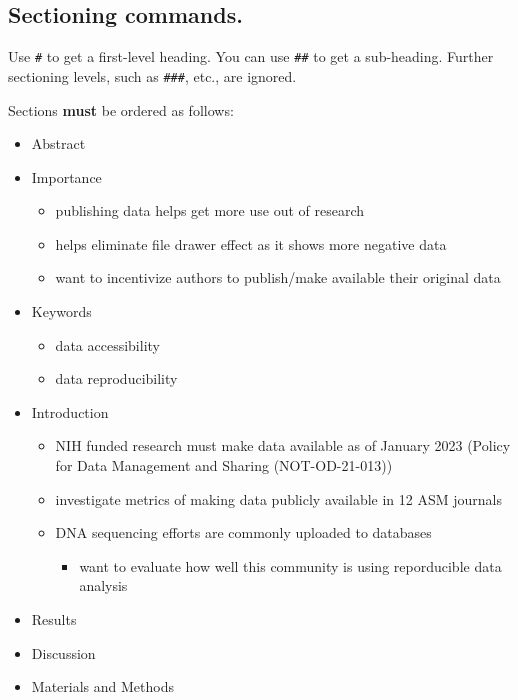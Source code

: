 \documentclass[
  lineno]{asm}
\providecommand{\tightlist}{%
  \setlength{\itemsep}{0pt}\setlength{\parskip}{0pt}}\usepackage{longtable,booktabs,array}
\begin{document}
\subsection{Sectioning commands.}\label{sectioning-commands.}

Use \texttt{\#} to get a first-level heading. You can use \texttt{\#\#}
to get a sub-heading. Further sectioning levels, such as
\texttt{\#\#\#}, etc., are ignored.

Sections \textbf{must} be ordered as follows:

\begin{itemize}
\tightlist
\item
  Abstract
\item
  Importance

  \begin{itemize}
  \tightlist
  \item
    publishing data helps get more use out of research
  \item
    helps eliminate file drawer effect as it shows more negative data
  \item
    want to incentivize authors to publish/make available their original
    data
  \end{itemize}
\item
  Keywords

  \begin{itemize}
  \tightlist
  \item
    data accessibility
  \item
    data reproducibility
  \end{itemize}
\item
  Introduction

  \begin{itemize}
  \tightlist
  \item
    NIH funded research must make data available as of January 2023
    (Policy for Data Management and Sharing (NOT-OD-21-013))
  \item
    investigate metrics of making data publicly available in 12 ASM
    journals
  \item
    DNA sequencing efforts are commonly uploaded to databases

    \begin{itemize}
    \tightlist
    \item
      want to evaluate how well this community is using reporducible
      data analysis
    \end{itemize}
  \end{itemize}
\item
  Results
\item
  Discussion
\item
  Materials and Methods


\end{itemize}
\end{document}
